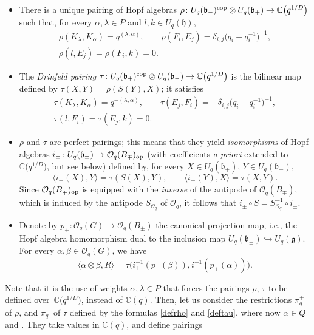 \documentclass[10pt,a4paper]{amsart}
\numberwithin{equation}{section}
\theoremstyle{definition}
\newcommand{\Oq}{\Oo_{q}}
\newcommand{\mc}{\mathbb{C}}
\newcommand{\Oo}{{\mathcal O}}
\newcommand{\ra}{\rightarrow}
\begin{document}
\begin{itemize}\itemsep=0pt
\item There is a unique pairing of Hopf algebras $\rho \colon U_q(\mathfrak{b}_-)^{\rm cop}\otimes U_q(\mathfrak{b}_+)\ra \mc\big(q^{1/D}\big)$ such that, for every $\alpha,\lambda\in P$ and $l,k\in U_q(\mathfrak{h})$,
\begin{gather}
\rho(K_\lambda,K_\alpha) = q^{(\lambda, \alpha)} ,\qquad \rho(F_i,E_j) = \delta_{i,j}\big(q_i-q_i^{-1}\big)^{-1},\nonumber \\
\rho(l,E_j) = \rho(F_i,k)=0.\label{defrho}
\end{gather}
\item The {\it Drinfeld pairing} $\tau \colon U_q(\mathfrak{b}_+)^{\rm cop}\otimes U_q(\mathfrak{b}_-)\ra \mc\big(q^{1/D}\big)$ is the bilinear map defined by $\tau(X,Y) = \rho(S(Y),X)$; it satisfies
\begin{gather}
\tau(K_\lambda,K_\alpha) = q^{-(\lambda, \alpha)} ,\qquad\tau(E_j,F_i) = - \delta_{i,j}\big(q_i-q_i^{-1}\big)^{-1} ,\nonumber\\
 \tau(l,F_i) = \tau(E_j,k)=0.\label{deftau}
\end{gather}
\item $\rho$ and $\tau$ are perfect pairings; this means that they yield {\it isomorphisms} of Hopf algebras $i_\pm \colon U_q(\mathfrak{b}_\pm) \ra \Oo_q(B_\mp)_{\rm op}$ (with coefficients {\it a priori} extended to $\mc\big(q^{1/D}\big)$, but see below) defined by, for every $X\in U_q(\mathfrak{b}_+)$, $Y\in U_q(\mathfrak{b}_-)$,
 \[\langle i_+(X), Y\rangle = \tau(S(X),Y),\qquad\langle i_-(Y) , X \rangle = \tau(X,Y).\]
Since $\Oo_q(B_\mp)_{\rm op}$ is equipped with the {\it inverse} of the antipode of $\Oo_q(B_\mp)$, which is induced by the antipode $S_{\Oq}$ of $\Oo_q$, it follows that $i_\pm \circ S = S_{\Oq}^{-1} \circ i_\pm$.
\item Denote by $p_\pm \colon \Oo_q(G) \ra \Oo_q(B_\pm)$ the canonical projection map, i.e., the Hopf algebra homomorphism dual to the inclusion map $U_q(\mathfrak{b}_\pm) \hookrightarrow U_q(\mathfrak{g})$. For every $\alpha,\beta \in \Oo_q(G)$, we have
\begin{equation}\label{Rpair}
\langle\alpha \otimes \beta , R \rangle = \tau \big(i_+^{-1}(p_-(\beta)), i_-^{-1}(p_+(\alpha))\big).
\end{equation}
\end{itemize}
Note that it is the use of weights $\alpha,\lambda\in P$ that forces the pairings $\rho$, $\tau$ to be defined over~$\mc\big(q^{1/D}\big)$, instead of $\mc(q)$. Then, let us consider the restrictions $\pi_q^+$ of $\rho$, and $\pi_q^-$ of $\tau$ defined by the formulas \eqref{defrho} and \eqref{deftau}, where now $\alpha\in Q$ and . They take values in $\mc(q)$, and define pairings
\end{document}
